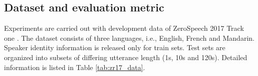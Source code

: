 \documentclass[a4paper]{article}
\begin{document}
\subsection{Dataset and evaluation metric}
Experiments are carried out with development data of ZeroSpeech 2017 Track one \cite{dunbar2017zero}.
The dataset consists of three languages, i.e., English, French and Mandarin. 
Speaker identity information is released only for train sets. Test sets are organized into subsets of differing utterance length (1s, 10s and 120s). Detailed information  is listed in Table \ref{tab:zr17_data}.

\begin{table}[htbp]
\renewcommand\arraystretch{0.8}
\centering
\caption{Development data in ZeroSpeech 2017 Track one}
\label{tab:zr17_data}
\end{table}
\end{document}
